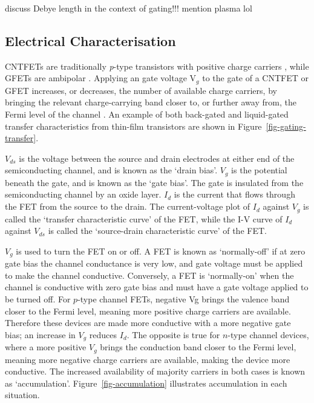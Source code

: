 \documentclass[
  a4paper,
]{scrbook}
\begin{document}
discuss Debye length in the context of gating!!! mention plasma lol

\hypertarget{electrical-characterisation}{%
\subsection{Electrical
Characterisation}\label{electrical-characterisation}}

CNTFETs are traditionally \emph{p}-type transistors with positive charge
carriers \autocite{Martel1998,Kong2000}, while GFETs are ambipolar
\autocite{Ohno2010a}. Applying an gate voltage V\(_g\) to the gate of a
CNTFET or GFET increases, or decreases, the number of available charge
carriers, by bringing the relevant charge-carrying band closer to, or
further away from, the Fermi level of the channel \autocite{Sze2006}. An
example of both back-gated and liquid-gated transfer characteristics
from thin-film transistors are shown in
Figure~\ref{fig-gating-transfer}.

\(V_{ds}\) is the voltage between the source and drain electrodes at
either end of the semiconducting channel, and is known as the `drain
bias'. \(V_g\) is the potential beneath the gate, and is known as the
`gate bias'. The gate is insulated from the semiconducting channel by an
oxide layer. \(I_d\) is the current that flows through the FET from the
source to the drain. The current-voltage plot of \(I_d\) against \(V_g\)
is called the `transfer characteristic curve' of the FET, while the I-V
curve of \(I_d\) against \(V_{ds}\) is called the `source-drain
characteristic curve' of the FET.

\(V_g\) is used to turn the FET on or off. A FET is known as
`normally-off' if at zero gate bias the channel conductance is very low,
and gate voltage must be applied to make the channel conductive.
Conversely, a FET is `normally-on' when the channel is conductive with
zero gate bias and must have a gate voltage applied to be turned off.
For \(p\)-type channel FETs, negative Vg brings the valence band closer
to the Fermi level, meaning more positive charge carriers are available.
Therefore these devices are made more conductive with a more negative
gate bias; an increase in \(V_g\) reduces \(I_d\). The opposite is true
for \(n\)-type channel devices, where a more positive \(V_g\) brings the
conduction band closer to the Fermi level, meaning more negative charge
carriers are available, making the device more conductive. The increased
availability of majority carriers in both cases is known as
`accumulation'. Figure~\ref{fig-accumulation} illustrates accumulation
in each situation.
\end{document}
